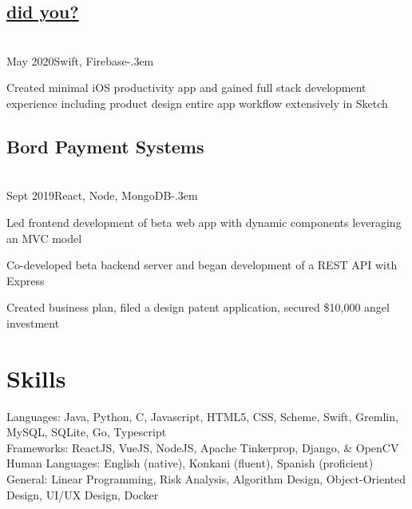 \documentclass{article}
\let\olditemize=\itemize \let\endolditemize=\enditemize
\renewenvironment{itemize}{\olditemize[topsep=0em] \itemsep-.3em}{\endolditemize}
\newcommand{\entry}[4]{\quad\textbf{#1}\\#2\qquad#3\qquad#4}
\begin{document}
	\subsection{\texorpdfstring{\protect\href{https://github.com/jaykudva/did-you-}{did you?}} ?}
	\entry{}{May 2020}{Swift, Firebase}
	\begin{itemize}
		\item Created minimal iOS productivity app and gained full stack development experience including product design entire app workflow extensively in Sketch
	\end{itemize}

	\subsection{Bord Payment Systems}
	\entry{}{Sept 2019}{React, Node, MongoDB}
	\begin{itemize}
		\item Led frontend development of beta web app with dynamic components leveraging an MVC model
		\item Co-developed beta backend server and began development of a REST API with Express
		\item Created business plan, filed a design patent application, secured \$10,000 angel investment
	\end{itemize}
	
	\section{Skills}
	Languages:
	Java, Python, C, Javascript, HTML5, CSS, Scheme, Swift, Gremlin, MySQL, SQLite, Go, Typescript \\
	Frameworks:
	ReactJS, VueJS, NodeJS, Apache Tinkerprop, Django,  \& OpenCV \\
	Human Languages:
	English (native), Konkani (fluent), Spanish (proficient) \\
	General:
	Linear Programming, Risk Analysis, Algorithm Design, Object-Oriented Design, UI/UX Design, Docker
	
	
\end{document}
